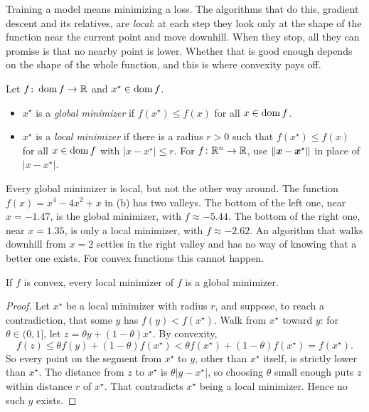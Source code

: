 Training a model means minimizing a loss. The algorithms that do this,
gradient descent and its relatives, are \emph{local}: at each step they look
only at the shape of the function near the current point and move
downhill. When they stop, all they can promise is that no nearby point is
lower. Whether that is good enough depends on the shape of the whole
function, and this is where convexity pays off.

\begin{definition}
  \label{def:minimizers}
  Let $f\colon \operatorname{dom} f \to \mathbb{R}$ and $x^\star \in \operatorname{dom} f$.
  \begin{itemize}
    \item $x^\star$ is a \emph{global minimizer} if $f(x^\star) \le f(x)$
      for all $x \in \operatorname{dom} f$.
    \item $x^\star$ is a \emph{local minimizer} if there is a radius
      $r > 0$ such that $f(x^\star) \le f(x)$ for all $x \in \operatorname{dom} f$ with
      $|x - x^\star| \le r$. For $f\colon \mathbb{R}^n \to \mathbb{R}$, use
      $\|\bm{x} - \bm{x}^\star\|$ in place of $|x - x^\star|$.
  \end{itemize}
\end{definition}

Every global minimizer is local, but not the other way around. The
function $f(x) = x^4 - 4x^2 + x$ in (b) has two
valleys. The bottom of the left one, near $x = -1.47$, is the global
minimizer, with $f \approx -5.44$. The bottom of the right one, near
$x = 1.35$, is only a local minimizer, with $f \approx -2.62$. An algorithm
that walks downhill from $x = 2$ settles in the right valley and has no way
of knowing that a better one exists. For convex functions this cannot
happen.

\begin{theorem}
  \label{thm:ch01-local-global}
  If $f$ is convex, every local minimizer of $f$ is a global minimizer.
\end{theorem}

\begin{proof}
  Let $x^\star$ be a local minimizer with radius $r$, and suppose, to reach
  a contradiction, that some $y$ has $f(y) < f(x^\star)$. Walk from
  $x^\star$ toward $y$: for $\theta \in (0, 1]$, let
  $z = \theta y + (1 - \theta) x^\star$. By convexity,
  \[
    f(z) \le \theta f(y) + (1 - \theta) f(x^\star)
    < \theta f(x^\star) + (1 - \theta) f(x^\star) = f(x^\star).
  \]
  So every point on the segment from $x^\star$ to $y$, other than
  $x^\star$ itself, is strictly lower than $x^\star$. The distance from $z$
  to $x^\star$ is $\theta |y - x^\star|$, so choosing $\theta$ small enough
  puts $z$ within distance $r$ of $x^\star$. That contradicts $x^\star$
  being a local minimizer. Hence no such $y$ exists.
\end{proof}

